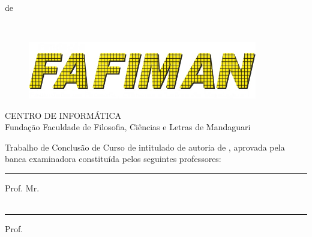 \documentclass{tcc}
\begin{document}
\vfill
\begin{center}
\MONTH de \the\year
\end{center}

\newpage

$ $
\vfill


\begin{flushright}
\end{flushright}

\newpage

\begin{figure}[H]
\centering
\includegraphics[width=100mm]{imagens/logo3.jpg}
\end{figure}

\begin{center}
CENTRO DE INFORMÁTICA \\
Fundação Faculdade de Filosofia, Ciências e Letras de Mandaguari
\end{center}

\vspace{0.05in}

Trabalho de Conclusão de Curso de \nomedocurso  intitulado \textit{\bf \em \thetitle} de autoria de \theauthor, aprovada pela banca examinadora constituída pelos seguintes professores: \\

\vspace{0.7in}

\hrule
\noindent Prof. Mr. \profa\\
\insta\\

\vspace{0.25in}

\hrule
\noindent Prof. \profb\\
\instb\\
\end{document}
